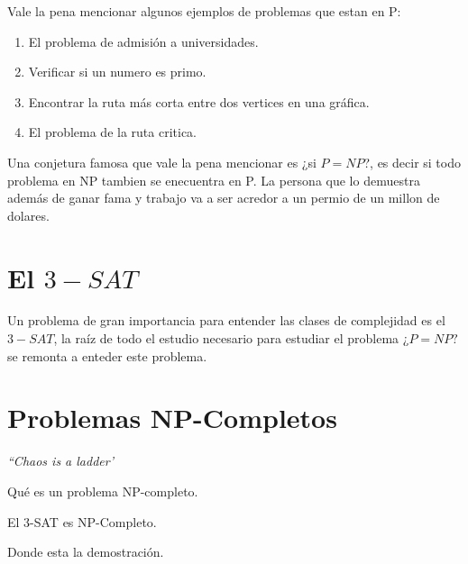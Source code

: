 Vale la pena mencionar algunos ejemplos de problemas que estan en P:
\begin{enumerate}
\item El problema de admisión a universidades.
\item Verificar si un numero es primo.
\item Encontrar la ruta más corta entre dos vertices en una gráfica.
\item El problema de la ruta critica. 
\end{enumerate}

Una conjetura famosa que vale la pena mencionar es ¿si $P=NP$?, es decir si todo problema en NP tambien se enecuentra en P. La persona que lo demuestra además de ganar fama y trabajo va a ser acredor a un permio de un millon de dolares. 

\section{El $3-SAT$}
Un problema de gran importancia para entender las clases de complejidad es el $3-SAT$, la raíz de todo el estudio necesario para estudiar el problema ¿$P=NP?$ se remonta a enteder este problema. 
\begin{dfn} 
\end{dfn}


\section{Problemas NP-Completos}
\begin{flushright}
\textit{``Chaos is a ladder'}
\end{flushright}
\begin{dfn}
Qué es un problema NP-completo. 
\end{dfn}
\begin{teo}
El 3-SAT es NP-Completo.
\end{teo}
Donde esta la demostración. 

